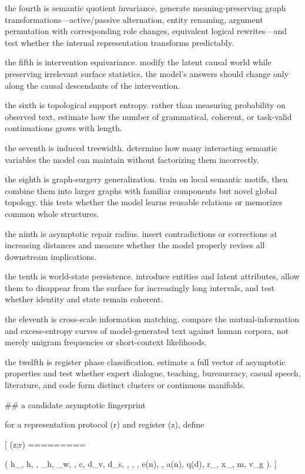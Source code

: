 the fourth is semantic quotient invariance. generate meaning-preserving graph transformations—active/passive alternation, entity renaming, argument permutation with corresponding role changes, equivalent logical rewrites—and test whether the internal representation transforms predictably.

the fifth is intervention equivariance. modify the latent causal world while preserving irrelevant surface statistics. the model’s answers should change only along the causal descendants of the intervention.

the sixth is topological support entropy. rather than measuring probability on observed text, estimate how the number of grammatical, coherent, or task-valid continuations grows with length.

the seventh is induced treewidth. determine how many interacting semantic variables the model can maintain without factorizing them incorrectly.

the eighth is graph-surgery generalization. train on local semantic motifs, then combine them into larger graphs with familiar components but novel global topology. this tests whether the model learns reusable relations or memorizes common whole structures.

the ninth is asymptotic repair radius. insert contradictions or corrections at increasing distances and measure whether the model properly revises all downstream implications.

the tenth is world-state persistence. introduce entities and latent attributes, allow them to disappear from the surface for increasingly long intervals, and test whether identity and state remain coherent.

the eleventh is cross-scale information matching. compare the mutual-information and excess-entropy curves of model-generated text against human corpora, not merely unigram frequencies or short-context likelihoods.

the twelfth is register phase classification. estimate a full vector of asymptotic properties and test whether expert dialogue, teaching, bureaucracy, casual speech, literature, and code form distinct clusters or continuous manifolds.

## a candidate asymptotic fingerprint

for a representation protocol (r) and register (z), define

[
\phi(z;r)
=========

\Big(
h_{},
h,
\alpha,
\beta_h,
\beta_w,
\rho,
c,
d_v,
d_s,
\delta,
\tau,
,
e(n),
\eta,
a(n),
q(d),
r_{},
x_{},
m,
v_g
\Big).
]

